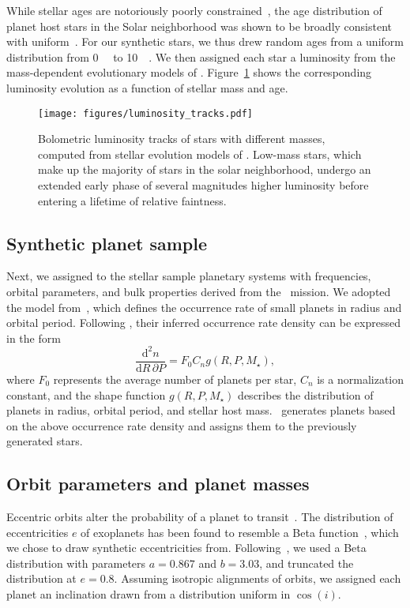\documentclass[twocolumn,twocolappendix,linenumbers]{aastex631}
\begin{document}
While stellar ages are notoriously poorly constrained~\cite[e.g.,][]{Adams2005}, the age distribution of planet host stars in the Solar neighborhood was shown to be broadly consistent with uniform~\citep{Reid2007,Gaidos2023}.
For our synthetic stars, we thus drew random ages from a uniform distribution from \SI{0}{\giga\year} to \SI{10}{\giga\year}.
We then assigned each star a luminosity from the mass-dependent evolutionary models of \citet{Baraffe1998}.
Figure~\ref{fig:luminosity_tracks} shows the corresponding luminosity evolution as a function of stellar mass and age.
\begin{figure}[ht!]
    \begin{centering}
        \texttt{[image: figures/luminosity\_tracks.pdf]}
        \caption{
            Bolometric luminosity tracks of stars with different masses, computed from stellar evolution models of \citet{Baraffe1998}.
            Low-mass stars, which make up the majority of stars in the solar neighborhood, undergo an extended early phase of several magnitudes higher luminosity before entering a lifetime of relative faintness.
        }
        \label{fig:luminosity_tracks}
    \end{centering}
\end{figure}


\subsection{Synthetic planet sample}\label{sec:syn_planets}
Next, we assigned to the stellar sample planetary systems with frequencies, orbital parameters, and bulk properties derived from the \kepler\ mission.
We adopted the model from~\citet{Bergsten2022}, which defines the occurrence rate of small planets in radius and orbital period.
Following \citet{Youdin2011a}, their inferred occurrence rate density can be expressed in the form
\begin{equation}
    \frac{\mathrm{d}^2n}{\mathrm{d}R \, \partial P} = F_0 C_n g(R, P, M_\star),
\end{equation}
where $F_0$ represents the average number of planets per star, $C_n$ is a normalization constant, and the shape function $g(R, P, M_\star)$ describes the distribution of planets in radius, orbital period, and stellar host mass.
\bioverse\ generates planets based on the above occurrence rate density and assigns them to the previously generated stars.


\subsection{Orbit parameters and planet masses}\label{sec:met-orbits_masses}
Eccentric orbits alter the probability of a planet to transit~\citep[e.g.,][]{Barnes2007a}.
The distribution of eccentricities $e$ of exoplanets has been found to resemble a Beta function~\citep{Kipping2013b}, which we chose to draw synthetic eccentricities from.
Following~\citet{Kipping2013b}, we used a Beta distribution with parameters $a=0.867$ and $b=3.03$, and truncated the distribution at $e = 0.8$.
Assuming isotropic alignments of orbits, we assigned each planet an inclination drawn from a distribution uniform in $\cos(i)$.
\end{document}
